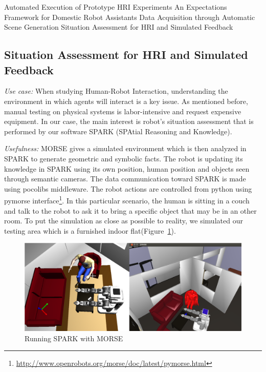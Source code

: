 \documentclass[conference]{IEEEtran}
\begin{document}
Automated Execution of Prototype HRI Experiments
An Expectations Framework for Domestic Robot Assistants
Data Acquisition through Automatic Scene Generation
Situation Assessment for HRI and Simulated Feedback

\subsection{Situation Assessment for HRI and Simulated Feedback}
\label{sc:assessment}

\emph{Use case:} When studying Human-Robot Interaction, understanding the environment in which
agents will interact is a key issue. As mentioned before, manual testing on
physical systems is labor-intensive and request expensive equipment.
In our case, the main interest is robot's situation assessment that is performed 
by our software SPARK (SPAtial Reasoning and Knowledge). 

\emph{Usefulness:} MORSE gives a simulated environment which is then analyzed in
 SPARK to generate geometric and symbolic facts. The robot is updating its
knowledge in SPARK using its own position, human position and objects seen through
semantic cameras. The data communication toward SPARK is made using pocolibs
middleware. The robot actions are controlled from python using pymorse
interface\footnote{\url{http://www.openrobots.org/morse/doc/latest/pymorse.html}}.
In this particular scenario, the human is sitting in a couch and talk to the
robot to ask it to bring a specific object that may be in an other room.
To put the simulation as close as possible to reality, we simulated our testing
area which is a furnished indoor flat(Figure~\ref{fig|spark}).

\begin{figure}[H]
      \centering
      \includegraphics[width=0.9\linewidth]{morsespark.png}
      \caption{Running SPARK with MORSE}
      \label{fig|spark}
\end{figure}
\end{document}
